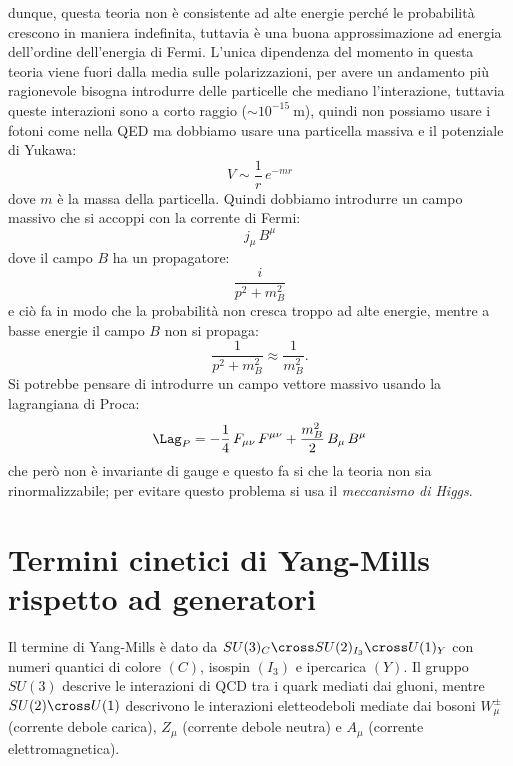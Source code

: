 dunque, questa teoria non è consistente ad alte energie perché le probabilità crescono in maniera indefinita, tuttavia è una buona approssimazione ad energia dell'ordine dell'energia di Fermi. L'unica dipendenza del momento in questa teoria viene fuori dalla media sulle polarizzazioni, per avere un andamento più ragionevole bisogna introdurre delle particelle che mediano l'interazione, tuttavia queste interazioni sono a corto raggio ($\sim 10^{-15}\ \unit{\meter}$), quindi non possiamo usare i fotoni come nella QED ma dobbiamo usare una particella massiva e il potenziale di Yukawa:
\begin{equation}
    V \sim \frac{1}{r}\, e^{-mr}
\end{equation}
dove $m$ è la massa della particella. Quindi dobbiamo introdurre un campo massivo che si accoppi con la corrente di Fermi:
\begin{equation}
    j_\mu\, B^\mu
\end{equation}
dove il campo $B$ ha un propagatore:
\begin{equation}
    \frac{i}{p^2 + m_B^2}
\end{equation}
e ciò fa in modo che la probabilità non cresca troppo ad alte energie, mentre a basse energie il campo $B$ non si propaga:
\begin{equation}
    \frac{1}{p^2 + m_B^2} \approx \frac{1}{m_B^2}.
\end{equation}
Si potrebbe pensare di introdurre un campo vettore massivo usando la lagrangiana di Proca:
\begin{equation}
    \Lag_P = -\frac{1}{4}\, F_{\mu\nu}\, F^{\mu\nu} + \frac{m_B^2}{2}\, B_\mu\, B^\mu
\end{equation}
che però non è invariante di gauge e questo fa si che la teoria non sia rinormalizzabile; per evitare questo problema si usa il \textit{meccanismo di Higgs}.


\section{Termini cinetici di Yang-Mills rispetto ad generatori}

Il termine di Yang-Mills è dato da $SU(3)_C \cross SU(2)_{I_3} \cross U(1)_Y$ con numeri quantici di colore $(C)$, isospin $(I_3)$ e ipercarica $(Y)$. Il gruppo $SU(3)$ descrive le interazioni di QCD tra i quark mediati dai gluoni, mentre $SU(2) \cross U(1)$ descrivono le interazioni eletteodeboli mediate dai bosoni $W_\mu^\pm$ (corrente debole carica), $Z_\mu$ (corrente debole neutra) e $A_\mu$ (corrente elettromagnetica).

